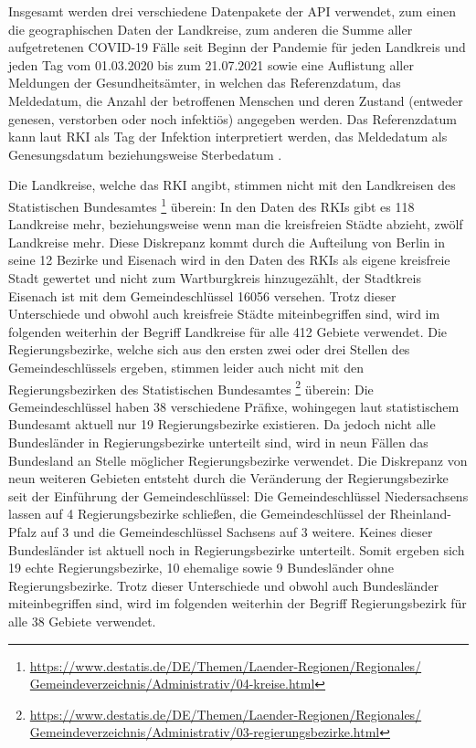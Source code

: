Insgesamt werden drei verschiedene Datenpakete der API verwendet, zum einen die geographischen Daten der Landkreise, zum anderen die Summe aller aufgetretenen COVID-19 Fälle seit Beginn der Pandemie für jeden Landkreis und jeden Tag vom 01.03.2020 bis zum 21.07.2021 sowie eine Auflistung aller Meldungen der Gesundheitsämter, in welchen das  Referenzdatum, das Meldedatum, die Anzahl der betroffenen Menschen und deren Zustand (entweder genesen, verstorben oder noch infektiös) angegeben werden. Das Referenzdatum kann laut RKI als Tag der Infektion interpretiert werden, das Meldedatum als Genesungsdatum beziehungsweise Sterbedatum \autocite{RKI_Bulletin}.

Die Landkreise, welche das RKI angibt, stimmen nicht mit den Landkreisen des Statistischen Bundesamtes
\footnote{\href{https://www.destatis.de/DE/Themen/Laender-Regionen/Regionales/Gemeindeverzeichnis/Administrativ/04-kreise.html}
{https://www.destatis.de/DE/Themen/Laender-Regionen/Regionales/\\Gemeindeverzeichnis/Administrativ/04-kreise.html}
}
überein: In den Daten des RKIs gibt es 118 Landkreise mehr, beziehungsweise wenn man die kreisfreien Städte abzieht, zwölf Landkreise mehr. Diese Diskrepanz kommt durch die Aufteilung von Berlin in seine 12 Bezirke und Eisenach wird in den Daten des RKIs als eigene kreisfreie Stadt gewertet und nicht zum Wartburgkreis hinzugezählt, der Stadtkreis Eisenach ist mit dem Gemeindeschlüssel 16056 versehen. Trotz dieser Unterschiede und obwohl auch kreisfreie Städte miteinbegriffen sind, wird im folgenden weiterhin der Begriff \glqq{}Landkreise\grqq{} für alle 412 Gebiete verwendet.
Die Regierungsbezirke, welche sich aus den ersten zwei oder drei Stellen des Gemeindeschlüssels ergeben, stimmen leider auch nicht mit den Regierungsbezirken des Statistischen Bundesamtes
\footnote{
\href{https://www.destatis.de/DE/Themen/Laender-Regionen/Regionales/Gemeindeverzeichnis/Administrativ/03-regierungsbezirke.html}
{https://www.destatis.de/DE/Themen/Laender-Regionen/Regionales/\\Gemeindeverzeichnis/Administrativ/03-regierungsbezirke.html}}
überein: Die Gemeindeschlüssel haben 38 verschiedene Präfixe, wohingegen laut statistischem Bundesamt aktuell nur 19 Regierungsbezirke existieren.
Da jedoch nicht alle Bundesländer in Regierungsbezirke unterteilt sind, wird in neun Fällen das Bundesland an Stelle möglicher Regierungsbezirke verwendet. Die Diskrepanz von neun weiteren Gebieten entsteht durch die Veränderung der Regierungsbezirke seit der Einführung der Gemeindeschlüssel: Die Gemeindeschlüssel Niedersachsens lassen auf 4 Regierungsbezirke schließen, die Gemeindeschlüssel der Rheinland-Pfalz auf 3 und die Gemeindeschlüssel Sachsens auf 3 weitere. Keines dieser Bundesländer ist aktuell noch in Regierungsbezirke unterteilt. Somit ergeben sich 19 echte Regierungsbezirke, 10 ehemalige sowie 9 Bundesländer ohne Regierungsbezirke.
Trotz dieser Unterschiede und obwohl auch Bundesländer miteinbegriffen sind, wird im folgenden weiterhin der Begriff \glqq{}Regierungsbezirk\grqq{} für alle 38 Gebiete verwendet.

